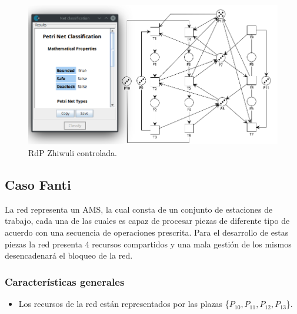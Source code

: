 \begin{figure}[H]
	\centering
	\includegraphics[width=\textwidth]{Figures/testing/zhiwuli_controlada.png}
	\caption[RdP Zhiwuli controlada]{RdP Zhiwuli controlada.}
	\label{fig:zhiwulicontrolada}
 \end{figure}
 
 
\subsection{Caso Fanti}
La red representa un AMS, la cual consta de un conjunto de estaciones de trabajo, cada una de las cuales es capaz de procesar piezas de diferente tipo de acuerdo con una secuencia de operaciones prescrita. Para el desarrollo de estas piezas la red presenta 4 recursos compartidos y una mala gestión de los mismos desencadenará el bloqueo de la red.

\subsubsection{Características generales}
\begin{itemize}
    \item Los recursos de la red están representados por las plazas \{$P_{10},P_{11},P_{12},P_{13}$\}.
\end{itemize}

